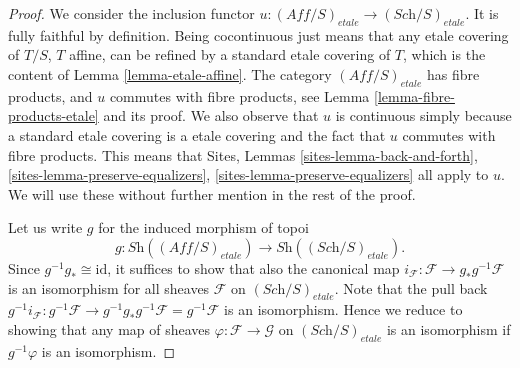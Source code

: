 \begin{proof}
We consider the inclusion functor
$u : (\textit{Aff}/S)_{etale} \to (\textit{Sch}/S)_{etale}$.
It is fully faithful by definition. Being cocontinuous
just means that any etale covering of $T/S$, $T$ affine,
can be refined by a standard etale covering of $T$, which
is the content of Lemma \ref{lemma-etale-affine}.
The category $(\textit{Aff}/S)_{etale}$ has fibre products, and $u$ commutes
with fibre products, see Lemma \ref{lemma-fibre-products-etale}
and its proof.
We also observe that $u$ is continuous
simply because a standard etale covering is a etale covering
and the fact that $u$ commutes with fibre products.
This means that
Sites, Lemmas \ref{sites-lemma-back-and-forth},
\ref{sites-lemma-preserve-equalizers},
\ref{sites-lemma-preserve-equalizers} all apply to $u$.
We will use these without further mention in the rest of the proof.

\medskip\noindent
Let us write $g$ for the induced morphism of topoi
$$
g : \textit{Sh}((\textit{Aff}/S)_{etale}) \longrightarrow
\textit{Sh}((\textit{Sch}/S)_{etale}).
$$
Since $g^{-1}g_* \cong \text{id}$, it suffices to show that
also the canonical map
$i_{\mathcal{F}} : \mathcal{F} \to g_* g^{-1} \mathcal{F}$
is an isomorphism for all sheaves $\mathcal{F}$ on
$(\textit{Sch}/S)_{etale}$. Note that the pull back
$g^{-1}i_{\mathcal{F}} : g^{-1} \mathcal{F} \to
g^{-1} g_* g^{-1} \mathcal{F} = g^{-1} \mathcal{F}$
is an isomorphism. Hence we reduce to showing that any
map of sheaves $\varphi : \mathcal{F} \to \mathcal{G}$ on
$(\textit{Sch}/S)_{etale}$ is an isomorphism if $g^{-1}\varphi$
is an isomorphism.


\end{proof}
